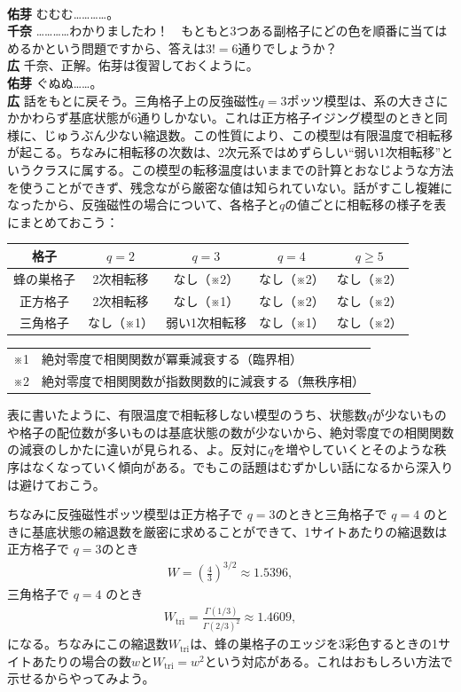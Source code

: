 \documentclass[paper=b5j,fontsize=12Q,jafontsize=12Q,baselineskip=21Q]{jlreq}
\DeclareRobustCommand{\hiron}{\textbf{広 }}
\DeclareRobustCommand{\chinan}{\textbf{千奈 }}
\DeclareRobustCommand{\umen}{\textbf{佑芽 }}
\begin{document}
\begin{refsection}
\\\umen むむむ…………。
\\\chinan …………わかりましたわ！　もともと3つある副格子にどの色を順番に当てはめるかという問題ですから、答えは$3!=6$通りでしょうか？
\\\hiron 千奈、正解。佑芽は復習しておくように。
\\\umen ぐぬぬ……。
\\\hiron 話をもとに戻そう。三角格子上の反強磁性$q=3$ポッツ模型は、系の大きさにかかわらず基底状態が6通りしかない。これは正方格子イジング模型のときと同様に、じゅうぶん少ない縮退数。この性質により、この模型は有限温度で相転移が起こる。ちなみに相転移の次数は、2次元系ではめずらしい``弱い1次相転移''というクラスに属する。この模型の転移温度はいままでの計算とおなじような方法を使うことができず、残念ながら厳密な値は知られていない。話がすこし複雑になったから、反強磁性の場合について、各格子と$q$の値ごとに相転移の様子を表にまとめておこう：

\begin{center}
\begin{tabular}{c||c|c|c|c}
  \hline
  格子 & $q=2$ & $q=3$ & $q=4$ & $q\ge5$ \\
  \hline\hline
  蜂の巣格子 & 2次相転移 & なし（※2） & なし（※2） & なし（※2）\\
  \hline
  正方格子 & 2次相転移 & なし（※1） & なし（※2） & なし（※2）\\
  \hline
  三角格子 & なし（※1） & 弱い1次相転移 & なし（※1） & なし（※2）\\
  \hline
\end{tabular}

\begin{tabular}{@{}ll@{}}
※1 & 絶対零度で相関関数が冪乗減衰する（臨界相）\\
※2 & 絶対零度で相関関数が指数関数的に減衰する（無秩序相）
\end{tabular}
\end{center}

表に書いたように、有限温度で相転移しない模型のうち、状態数$q$が少ないものや格子の配位数が多いものは基底状態の数が少ないから、絶対零度での相関関数の減衰のしかたに違いが見られる、よ。反対に$q$を増やしていくとそのような秩序はなくなっていく傾向がある。でもこの話題はむずかしい話になるから深入りは避けておこう。

ちなみに反強磁性ポッツ模型は正方格子で $q=3$のときと三角格子で $q=4$ のときに基底状態の縮退数を厳密に求めることができて、1サイトあたりの縮退数は正方格子で $q=3$のとき
\begin{align}
  W = \left( \frac{4}{3} \right)^{3/2} \approx 1.5396,\label{eq:n_degeneracy_afm_q=3_square}
\end{align}
三角格子で $q=4$ のとき
\begin{align}
  W_{\mathrm{tri}} = \frac{\Gamma(1/3)}{\Gamma(2/3)^2} \approx 1.4609,
\end{align}
になる。ちなみにこの縮退数$W_{\mathrm{tri}}$は、蜂の巣格子のエッジを3彩色するときの1サイトあたりの場合の数$w$と$W_{\mathrm{tri}}=w^2$という対応がある。これはおもしろい方法で示せるからやってみよう。


\end{refsection}
\end{document}
